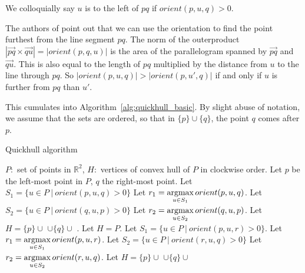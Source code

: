 We colloquially say $u$ is to the left of $pq$ if $orient(p, u, q) > 0$.

The authors of \cite{quickerthanqhull} point out that we can use the 
orientation to find the point furthest from the line segment $pq$. 
The norm of the outerproduct
$|\vec{pq} \times \vec{qu}| = |orient(p, q, u)|$ is the area of the
parallelogram spanned by $\vec{pq}$ and $\vec{qu}$. This is also equal to
the length of $pq$ multiplied by the distance from $u$ to the line through 
$pq$. So $|orient(p, u, q)| > |orient(p, u', q)|$ if and only if $u$ is further
from $pq$ than $u'$. %

%

This cumulates into Algorithm~\ref{alg:quickhull_basic}. By slight abuse
of notation, we assume that the sets are ordered, so that in $\{p\} \cup \{q\}$,
the point $q$ comes after $p$.

\begin{algorithm}[ht]
\begin{algorithmic}[1]
    \caption{Quickhull algorithm}\label{alg:quickhull_basic}
    \Require $P: $ set of points in $\mathbb{R}^2$,
    \Ensure $H: $ vertices of convex hull of $P$ in clockwise order.
    \State Let $p$ be the left-most point in $P$, $q$ the right-most point.
    \State Let $S_1 = \{u \in P \ | \ orient(p, u, q) > 0\}$
    \State Let $r_1 = \operatorname*{argmax}\limits_{u \in S_1}orient(p, u, q)$.
    \State Let $S_2 = \{u \in P \ | \ orient(q, u, p) > 0\}$
    \State Let $r_2 = \operatorname*{argmax}\limits_{u \in S_2}orient(q, u, p)$.
    \State Let $H = \{p\} \cup $ 
            $\cup \{q\} \cup$ .
            \State Let $H = P$.
        \Else
            \State Let $S_1 = \{u \in P \ | \ orient(p, u, r) > 0\}$.
            \State Let $r_1 = \operatorname*{argmax}\limits_{u \in S_1}orient(p, u, r)$.
            \State Let $S_2 = \{u \in P \ | \ orient(r, u, q) > 0\}$
            \State Let $r_2 = \operatorname*{argmax}\limits_{u \in S_2}orient(r, u, q)$.
            \State Let $H = \{p\} \cup $ 
                   $\cup \{q\} \cup$ 
        \EndIf
    \EndFunction
\end{algorithmic}
\end{algorithm}

